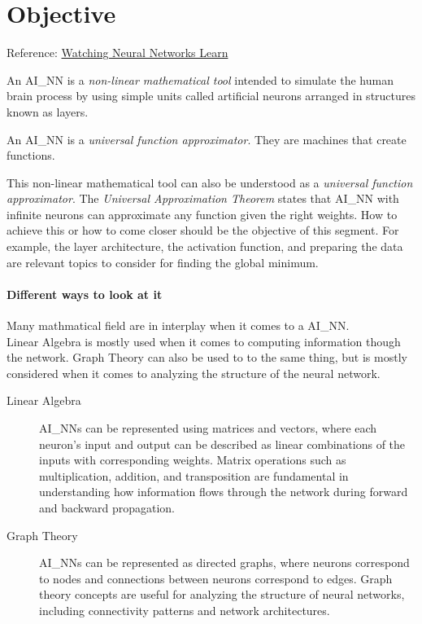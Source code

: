 \section{Objective}

Reference: \href{https://youtu.be/TkwXa7Cvfr8?si=V8cJG_DQAoA2fndE}{Watching Neural Networks Learn}

An \gls{AI_NN} is a \textit{non-linear mathematical tool} intended to simulate the human brain process by using simple units called artificial neurons arranged in structures known as layers.
\begin{center}
	An \gls{AI_NN} is a \textit{universal function approximator}. They are machines that create functions.
\end{center}

This non-linear mathematical tool can also be understood as a \textit{universal function approximator}. The \textit{Universal Approximation Theorem} states that \gls{AI_NN} with infinite neurons can approximate any function given the right weights. How to achieve this or how to come closer should be the objective of this segment. For example, the layer architecture, the activation function, and preparing the data are relevant topics to consider for finding the global minimum.

\paragraph{Different ways to look at it}
Many mathmatical field are in interplay when it comes to a \gls{AI_NN}.\\

Linear Algebra is mostly used when it comes to computing information though the network. Graph Theory can also be used to to the same thing, but is mostly considered when it comes to analyzing the structure of the neural network. 

\begin{description}
	\item[Linear Algebra] \glspl{AI_NN} can be represented using matrices and vectors, where each neuron's input and output can be described as linear combinations of the inputs with corresponding weights. Matrix operations such as multiplication, addition, and transposition are fundamental in understanding how information flows through the network during forward and backward propagation.
	\item[Graph Theory] \glspl{AI_NN} can be represented as directed graphs, where neurons correspond to nodes and connections between neurons correspond to edges. Graph theory concepts are useful for analyzing the structure of neural networks, including connectivity patterns and network architectures.
\end{description}


